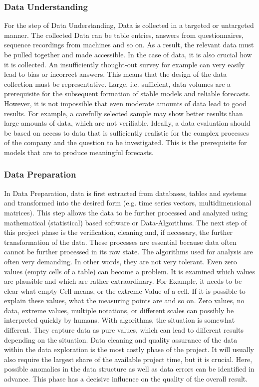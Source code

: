\subsubsection{Data Understanding}
For the step of Data Understanding, Data is collected in a targeted or untargeted manner. 
The collected Data can be table entries, answers from questionnaires, sequence recordings from machines and so on. 
As a result, the relevant data must be pulled together and made accessible. In the case of data, it is also crucial how it is collected. 
An insufficiently thought-out survey for example can very easily lead to bias or incorrect answers. 
This means that the design of the data collection must be representative. 
Large, i.e. sufficient, data volumes are a prerequisite for the subsequent formation of stable models and reliable forecasts. 
However, it is not impossible that even moderate amounts of data lead to good results. 
For example, a carefully selected sample may show better results than large amounts of data, which are not verifiable. 
Ideally, a data evaluation should be based on access to data that is sufficiently realistic for the complex processes of the company and the question to be investigated. 
This is the prerequisite for models that are to produce meaningful forecasts.

\subsubsection{Data Preparation}
In Data Preparation, data is first extracted from databases, tables and systems and transformed into the desired form (e.g. time series vectors, multidimensional matrices). 
This step allows the data to be further processed and analyzed using mathematical (statistical) based software or Data-Algorithms. 
The next step of this project phase is the verification, cleaning and, if necessary, the further transformation of the data. 
These processes are essential because data often cannot be further processed in its raw state. The algorithms used for analysis are often very demanding. 
In other words, they are not very tolerant. Even zero values (empty cells of a table) can become a problem. 
It is examined which values are plausible and which are rather extraordinary. For Example, it needs to be clear what empty Cell means, or the extreme Value of a cell. 
If it is possible to explain these values, what the measuring points are and so on.
Zero values, no data, extreme values, multiple notations, or different scales can possibly be interpreted quickly by humans. 
With algorithms, the situation is somewhat different. They capture data as pure values, which can lead to different results depending on the situation. 
Data cleaning and quality assurance of the data within the data exploration is the most costly phase of the project. 
It will usually also require the largest share of the available project time, but it is crucial. 
Here, possible anomalies in the data structure as well as data errors can be identified in advance. 
This phase has a decisive influence on the quality of the overall result. 

